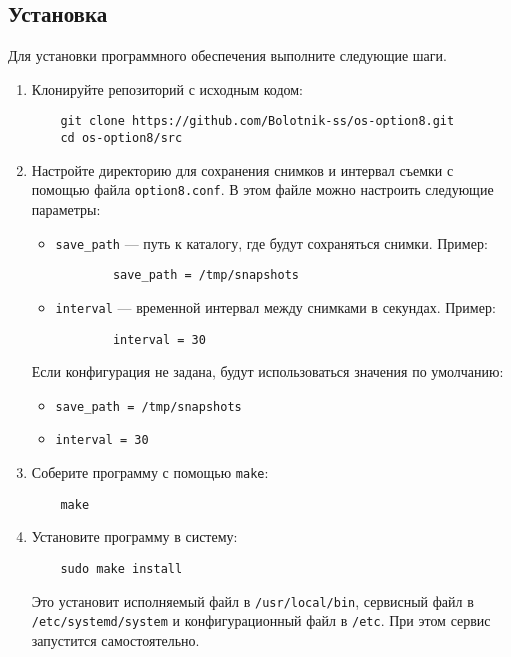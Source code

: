 \documentclass[12pt]{article}
\begin{document}
\subsection*{Установка}

Для установки программного обеспечения выполните следующие шаги.

\begin{enumerate}
    \item Клонируйте репозиторий с исходным кодом:
    \begin{verbatim}
    git clone https://github.com/Bolotnik-ss/os-option8.git
    cd os-option8/src
    \end{verbatim}

    \item Настройте директорию для сохранения снимков и интервал съемки с помощью файла \texttt{option8.conf}. В этом файле можно настроить следующие параметры:
    \begin{itemize}
        \item \texttt{save\_path} — путь к каталогу, где будут сохраняться снимки. Пример:
        \begin{verbatim}
        save_path = /tmp/snapshots
        \end{verbatim}

        \item \texttt{interval} — временной интервал между снимками в секундах. Пример:
        \begin{verbatim}
        interval = 30
        \end{verbatim}
    \end{itemize}

    Если конфигурация не задана, будут использоваться значения по умолчанию:
    \begin{itemize}
        \item \texttt{save\_path = /tmp/snapshots}
        \item \texttt{interval = 30}
    \end{itemize}

    \item Соберите программу с помощью \texttt{make}:
    \begin{verbatim}
    make
    \end{verbatim}

    \item Установите программу в систему:
    \begin{verbatim}
    sudo make install
    \end{verbatim}

    Это установит исполняемый файл в \texttt{/usr/local/bin}, сервисный файл в \texttt{/etc/systemd/system} и конфигурационный файл в \texttt{/etc}. При этом сервис запустится самостоятельно.

\end{enumerate}
\end{document}

